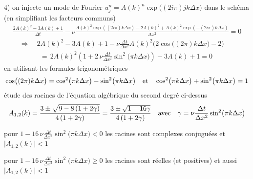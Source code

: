 \documentclass[12pt,a4paper]{article}
\begin{document}
4) on injecte un mode de Fourier $u_j^n=A(k)^n \exp\!\big( (2 i \pi) j k \Delta x \big)$ dans le sch\'ema 
(en simplifiant les facteurs communs)
$$
\begin{array}{l}
\displaystyle \frac{2 A(k)^2 - 3 A(k) + 1}{\Delta t} - \nu \frac{A(k)^2 \exp((2 i \pi) k \Delta x) - 2 A(k)^2 + A(k)^2 \exp(-(2 i \pi) k \Delta x)}{\Delta x^2} = 0 \\[2ex]
\quad \Longrightarrow \quad \displaystyle 2 A(k)^2 - 3 A(k) + 1 - \nu \frac{\Delta t}{\Delta x^2} A(k)^2 \big( 2 \cos\!\big( (2 \pi) k \Delta x \big) - 2 \big)  \\[2ex]
\qquad \qquad =\, \displaystyle 2 A(k)^2 \left( 1 + 2\,\nu \frac{\Delta t}{\Delta x^2} \sin^2\!\big( \pi k \Delta x \big) \right) - 3 A(k) + 1 = 0
\end{array}
$$
en utilisant les formules trigonom\'etriques
$$ \cos\!\big( (2 \pi) k \Delta x \big) = \cos^2\!\big( \pi k \Delta x \big) - \sin^2\!\big( \pi k \Delta x \big) \quad {\rm et} \quad \cos^2\!\big( \pi k \Delta x \big) + \sin^2\!\big( \pi k \Delta x \big) = 1 $$
\'etude des racines de l'\'equation alg\'ebrique du second degr\'e ci-dessus
$$ A_{1,2}(k) = \frac{3 \pm \sqrt{ 9 - 8 \left( 1 + 2 \gamma \right) }}{4 \left( 1 + 2 \gamma \right)} = \frac{3 \pm \sqrt{ 1 - 16 \gamma }}{4 \left( 1 + 2 \gamma \right)} \quad {\rm avec} \quad \gamma = \nu \frac{\Delta t}{\Delta x^2} \sin^2\!\big( \pi k \Delta x \big) $$

\noindent pour $\displaystyle 1 - 16\,\nu \frac{\Delta t}{\Delta x^2} \sin^2\!\big( \pi k \Delta x \big) < 0$ les racines sont complexes conjugu\'ees et $\big| A_{1,2}(k) \big| < 1$

\noindent pour $\displaystyle 1 - 16\,\nu \frac{\Delta t}{\Delta x^2} \sin^2\!\big( \pi k \Delta x \big) \geq 0$ les racines sont r\'eelles (et positives) et aussi $\big| A_{1,2}(k) \big| < 1$
\end{document}
